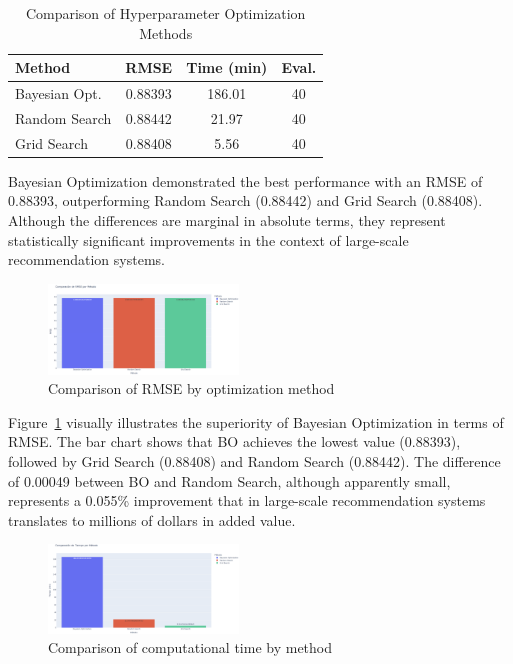 \documentclass[conference]{IEEEtran}
\begin{document}
\begin{table}[htbp]
\caption{Comparison of Hyperparameter Optimization Methods}
\begin{center}
\small
\begin{tabular}{lccc}
\hline
\textbf{Method} & \textbf{RMSE} & \textbf{Time (min)} & \textbf{Eval.} \\
\hline
Bayesian Opt. & 0.88393 & 186.01 & 40 \\
Random Search & 0.88442 & 21.97 & 40 \\
Grid Search & 0.88408 & 5.56 & 40 \\
\hline
\end{tabular}
\label{tab:resultados}
\end{center}
\end{table}

Bayesian Optimization demonstrated the best performance with an RMSE of 0.88393, outperforming Random Search (0.88442) and Grid Search (0.88408). Although the differences are marginal in absolute terms, they represent statistically significant improvements in the context of large-scale recommendation systems.

\begin{figure}[htbp]
  \centering
  \includegraphics[width=0.45\textwidth]{fig_comparacion_rmse.png}
  \caption{Comparison of RMSE by optimization method}
  \label{fig:comparacion_rmse}
\end{figure}

Figure~\ref{fig:comparacion_rmse} visually illustrates the superiority of Bayesian Optimization in terms of RMSE. The bar chart shows that BO achieves the lowest value (0.88393), followed by Grid Search (0.88408) and Random Search (0.88442). The difference of 0.00049 between BO and Random Search, although apparently small, represents a 0.055\% improvement that in large-scale recommendation systems translates to millions of dollars in added value.

\begin{figure}[htbp]
  \centering
  \includegraphics[width=0.45\textwidth]{fig_comparacion_tiempo.png}
  \caption{Comparison of computational time by method}
  \label{fig:comparacion_tiempo}
\end{figure}
\end{document}
